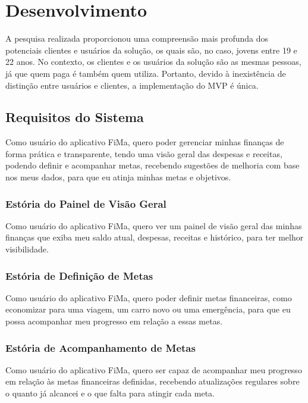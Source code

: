 % 

\chapter[Desenvolvimento]{Desenvolvimento}

A pesquisa realizada proporcionou uma compreensão mais profunda dos potenciais clientes e usuários da solução, os quais são, no caso, jovens entre 19 e 22 anos. No contexto, os clientes e os usuários da solução são as mesmas pessoas, já que quem paga é também quem utiliza. Portanto, devido à inexistência de distinção entre usuários e clientes, a implementação do MVP é única.

\section{Requisitos do Sistema}
Como usuário do aplicativo FiMa, quero poder gerenciar minhas finanças de forma prática e transparente, tendo uma visão geral das despesas e receitas, podendo definir e acompanhar metas, recebendo sugestões de melhoria com base nos meus dados, para que eu atinja minhas metas e objetivos.

\subsection{Estória do Painel de Visão Geral}
Como usuário do aplicativo FiMa, quero ver um painel de visão geral das minhas finanças que exiba meu saldo atual, despesas, receitas e histórico, para ter melhor visibilidade.

\subsection{Estória de Definição de Metas}
Como usuário do aplicativo FiMa, quero poder definir metas financeiras, como economizar para uma viagem, um carro novo ou uma emergência, para que eu possa acompanhar meu progresso em relação a essas metas.

\subsection{Estória de Acompanhamento de Metas}
Como usuário do aplicativo FiMa, quero ser capaz de acompanhar meu progresso em relação às metas financeiras definidas, recebendo atualizações regulares sobre o quanto já alcancei e o que falta para atingir cada meta.

